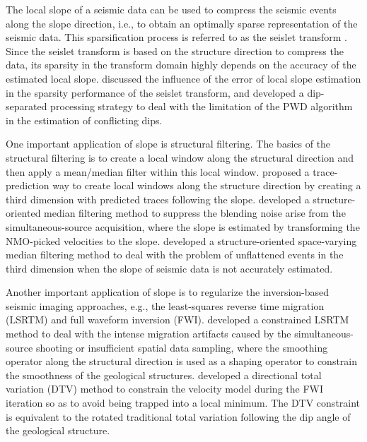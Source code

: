 The local slope of a seismic data can be used to compress the seismic events along the slope direction, i.e., to obtain an optimally sparse representation of the seismic data. This sparsification process is referred to as the seislet transform \cite[]{fomel2010seislet}. Since the seislet transform is based on the structure direction to compress the data, its sparsity in the transform domain highly depends on the accuracy of the estimated local slope. \cite{yangkang2016emd} discussed the influence of the error of local slope estimation in the sparsity performance of the seislet transform, and developed a dip-separated processing strategy to deal with the limitation of the PWD algorithm in the estimation of conflicting dips. 

One important application of slope is structural filtering. The basics of the structural filtering is to create a local window along the structural direction and then apply a mean/median filter within this local window. \cite{liuyang2010} proposed a trace-prediction way to create local windows along the structure direction by creating a third dimension with predicted traces following the slope. \cite{shuwei2016somf} developed a structure-oriented median filtering method to suppress the blending noise arise from the simultaneous-source acquisition, where the slope is estimated by transforming the NMO-picked velocities to the slope. \cite{sosvmf} developed a structure-oriented space-varying median filtering method to deal with the problem of unflattened events in the third  dimension when the slope of seismic data is not accurately estimated. 

Another important application of slope is to regularize the inversion-based seismic imaging approaches, e.g., the least-squares reverse time migration (LSRTM) and full waveform inversion (FWI). \cite{zhiguang2016} developed a constrained LSRTM method to deal with the intense migration artifacts caused by the simultaneous-source shooting or insufficient spatial data sampling, where the smoothing operator along the structural direction is used as a shaping operator to constrain the smoothness of the geological structures. \cite{qushan2019geo} developed a directional total variation (DTV) method to constrain the velocity model during the FWI iteration so as to avoid being trapped into a local minimum. The DTV constraint is equivalent to the rotated traditional total variation following the dip angle of the geological structure. 

